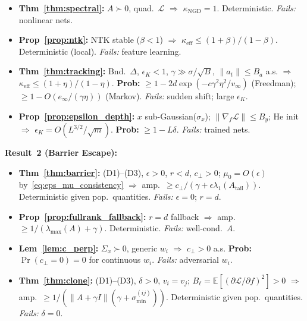 \documentclass{article}
\providecommand{\E}{\mathbb{E}}
\providecommand{\norm}[1]{\lVert #1 \rVert}
\theoremstyle{plain}
\theoremstyle{definition}
\theoremstyle{remark}
\begin{document}
\vspace{-2pt}
{\footnotesize
\begin{itemize}\setlength{\itemsep}{1pt}
\item \textbf{Thm~\ref{thm:spectral}:} $A\!\succ\!0$, quad.\ $\mathcal{L}$ $\Rightarrow$ $\kappa_{\mathrm{NGD}}\!=\!1$. Deterministic. \emph{Fails:} nonlinear nets.
\item \textbf{Prop~\ref{prop:ntk}:} NTK stable ($\beta\!<\!1$) $\Rightarrow$ $\kappa_{\mathrm{eff}}\!\leq\!(1\!+\!\beta)/(1\!-\!\beta)$. Deterministic (local). \emph{Fails:} feature learning.
\item \textbf{Thm~\ref{thm:tracking}:} Bnd.\ $\Delta$, $\epsilon_K\!<\!1$, $\gamma\!\gg\!\sigma/\!\sqrt{B}$, $\norm{a_t}\!\leq\!B_a$ a.s. $\Rightarrow$ $\kappa_{\mathrm{eff}}\!\leq\!(1\!+\!\eta)/(1\!-\!\eta)$. \textbf{Prob:} $\geq 1\!-\!2d\exp(-c\gamma^2\eta^2/v_\infty)$ (Freedman); $\geq 1\!-\!O(e_\infty/(\gamma\eta))$ (Markov). \emph{Fails:} sudden shift; large $\epsilon_K$.
\item \textbf{Prop~\ref{prop:epsilon_depth}:} $x$ sub-Gaussian($\sigma_x$); $\norm{\nabla_f\mathcal{L}}\!\leq\!B_y$; He init $\Rightarrow$ $\epsilon_K\!=\!O(L^{3/2}/\!\sqrt{m})$. \textbf{Prob:} $\geq 1\!-\!L\delta$. \emph{Fails:} trained nets.
\end{itemize}
}

\vspace{-2pt}
\textbf{Result~2 (Barrier Escape):}

\vspace{-2pt}
{\footnotesize
\begin{itemize}\setlength{\itemsep}{1pt}
\item \textbf{Thm~\ref{thm:barrier}:} (D1)--(D3), $\epsilon\!>\!0$, $r\!<\!d$, $c_\perp\!>\!0$; $\mu_0\!=\!O(\epsilon)$ by~\eqref{eq:eps_mu_consistency} $\Rightarrow$ amp.~$\geq c_\perp/(\gamma+\epsilon\lambda_1(A_{\mathrm{tail}}))$. Deterministic given pop.\ quantities. \emph{Fails:} $\epsilon\!=\!0$; $r\!=\!d$.
\item \textbf{Prop~\ref{prop:fullrank_fallback}:} $r\!=\!d$ fallback $\Rightarrow$ amp.~$\geq 1/(\lambda_{\max}(A)+\gamma)$. Deterministic. \emph{Fails:} well-cond.\ $A$.
\item \textbf{Lem~\ref{lem:c_perp}:} $\Sigma_x\!\succ\!0$, generic $w_i$ $\Rightarrow$ $c_\perp\!>\!0$ a.s. \textbf{Prob:} $\Pr(c_\perp\!=\!0)\!=\!0$ for continuous $w_i$. \emph{Fails:} adversarial $w_i$.
\item \textbf{Thm~\ref{thm:clone}:} (D1)--(D3), $\delta\!>\!0$, $v_i\!=\!v_j$; $B_\ell\!=\!\E[(\partial\mathcal{L}/\partial f)^2]\!>\!0$ $\Rightarrow$ amp.~$\geq 1/(\|A\!+\!\gamma I\|(\gamma\!+\!\sigma_{\min}^{(ij)}))$. Deterministic given pop.\ quantities. \emph{Fails:} $\delta\!=\!0$.
\end{itemize}
}
\end{document}
